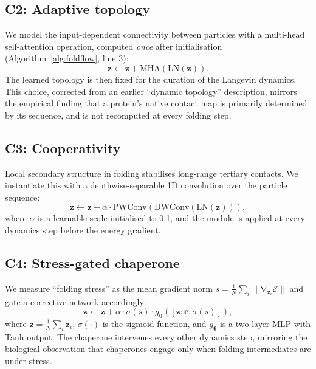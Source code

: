 \documentclass[fleqn,10pt]{article}
\newcommand{\E}{\mathcal{E}}
\newcommand{\bz}{\mathbf{z}}
\newcommand{\bc}{\mathbf{c}}
\newcommand{\btheta}{\boldsymbol{\theta}}
\DeclareMathOperator{\grad}{\nabla}
\begin{document}
\subsection*{C2: Adaptive topology}

We model the input-dependent connectivity between particles with a
multi-head self-attention operation, computed \emph{once} after
initialisation (Algorithm~\ref{alg:foldflow}, line 3):
\begin{equation}
  \bz \leftarrow \bz + \text{MHA}(\text{LN}(\bz)).
\end{equation}
The learned topology is then fixed for the duration of the
Langevin dynamics. This choice, corrected from an earlier
``dynamic topology'' description, mirrors the empirical finding that
a protein's native contact map is primarily determined by its
sequence, and is not recomputed at every folding step.

\subsection*{C3: Cooperativity}

Local secondary structure in folding stabilises long-range tertiary
contacts. We instantiate this with a depthwise-separable 1D
convolution over the particle sequence:
\begin{equation}
  \bz \leftarrow \bz + \alpha \cdot \text{PWConv}(\text{DWConv}(\text{LN}(\bz))),
\end{equation}
where $\alpha$ is a learnable scale initialised to 0.1, and the
module is applied at every dynamics step before the energy
gradient.

\subsection*{C4: Stress-gated chaperone}

We measure ``folding stress'' as the mean gradient norm
$s = \frac{1}{N}\sum_i \|\grad_{\bz_i} \E\|$ and gate a corrective
network accordingly:
\begin{equation}
  \bz \leftarrow \bz + \alpha \cdot \sigma(s) \cdot
    g_{\btheta}\!\left([\bar{\bz}; \bc; \sigma(s)]\right),
\end{equation}
where $\bar{\bz} = \frac{1}{N}\sum_i \bz_i$, $\sigma(\cdot)$ is the
sigmoid function, and $g_{\btheta}$ is a two-layer MLP with Tanh output.
The chaperone intervenes every other dynamics step, mirroring the
biological observation that chaperones engage only when folding
intermediates are under stress.\cite{hartl2011molecular}
\end{document}
